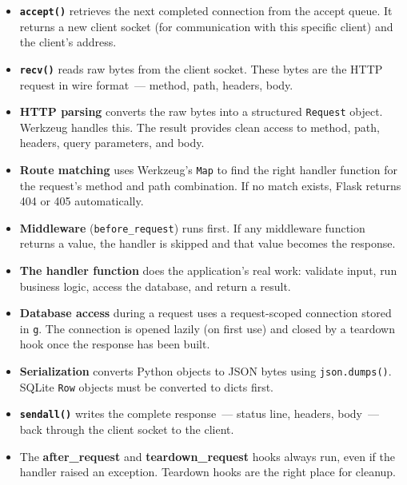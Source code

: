 \label{05-internal-request-execution:key-takeaways}
\begin{takeaways}

\begin{itemize}
\tightlist
\item
  \textbf{\texttt{accept()}} retrieves the next completed connection from the accept queue. It returns a new client socket (for communication with this specific client) and the client's address.
\item
  \textbf{\texttt{recv()}} reads raw bytes from the client socket. These bytes are the HTTP request in wire format~--- method, path, headers, body.
\item
  \textbf{HTTP parsing} converts the raw bytes into a structured \texttt{Request} object. Werkzeug handles this. The result provides clean access to method, path, headers, query parameters, and body.
\item
  \textbf{Route matching} uses Werkzeug's \texttt{Map} to find the right handler function for the request's method and path combination. If no match exists, Flask returns 404 or 405 automatically.
\item
  \textbf{Middleware} (\texttt{before\_request}) runs first. If any middleware function returns a value, the handler is skipped and that value becomes the response.
\item
  \textbf{The handler function} does the application's real work: validate input, run business logic, access the database, and return a result.
\item
  \textbf{Database access} during a request uses a request-scoped connection stored in \texttt{g}. The connection is opened lazily (on first use) and closed by a teardown hook once the response has been built.
\item
  \textbf{Serialization} converts Python objects to JSON bytes using \texttt{json.dumps()}. SQLite \texttt{Row} objects must be converted to dicts first.
\item
  \textbf{\texttt{sendall()}} writes the complete response~--- status line, headers, body~--- back through the client socket to the client.
\item
  The \textbf{after\_request} and \textbf{teardown\_request} hooks always run, even if the handler raised an exception. Teardown hooks are the right place for cleanup.
\end{itemize}

\end{takeaways}

